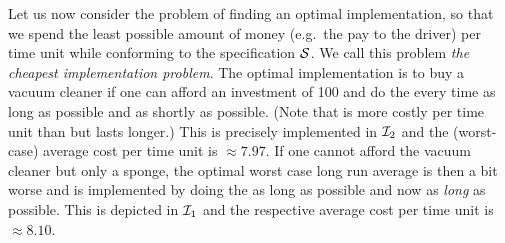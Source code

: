 Let us now consider the problem of finding an optimal implementation, so that we
spend the least possible amount of money (e.g.~the pay to the driver) per time
unit while conforming to the specification $\mathcal S$. 
We call this problem \emph{the
cheapest implementation problem}.
The optimal implementation is to buy a vacuum cleaner if one can afford an
investment of 100 and do the \BigClean every time as long as possible and \Wait
as shortly as possible. (Note that \BigClean is more costly per time unit than
\SmallClean but lasts longer.) This is precisely implemented in $\mathcal I_2$ and
the (worst-case) average cost per time unit is $\approx7.97$. 
If one cannot afford the
vacuum cleaner but only a sponge, the optimal worst case long run average is
then a bit worse and is implemented by doing the \SmallClean as long as
possible and \Wait now as \emph{long} as possible. This is depicted in $\mathcal I_1$
and the respective average cost per time unit is $\approx8.10$. 
